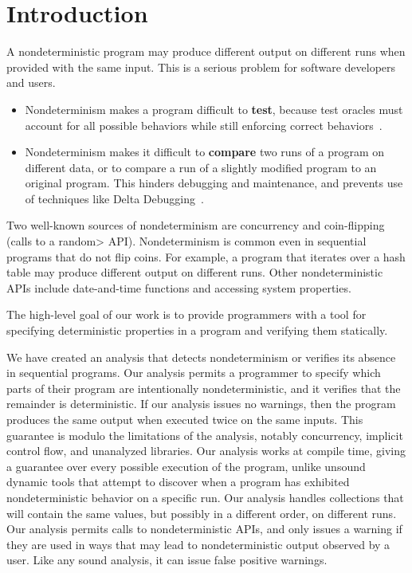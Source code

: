 \section{Introduction\label{sec:introduction}}

A nondeterministic program may produce different output on different runs
when provided with the same input. This is a serious problem for software developers and users.
\begin{itemize}
\item
  Nondeterminism makes a program difficult to \textbf{test}, because test
  oracles must account for all possible behaviors while still enforcing
  correct behaviors~\cite{LuoHEM2014,ShiGLM2016,BellLHEYM2018,Sudarshan}.
\item
  Nondeterminism makes it difficult to \textbf{compare} two runs of a
  program on different data, or to compare a run of a slightly modified
  program to an original program.  This hinders debugging and maintenance,
  and prevents use of techniques like Delta Debugging~\cite{Zeller1999,YuLCZ2012}.
\end{itemize}

Two well-known sources of nondeterminism are concurrency
and coin-flipping
(calls to a \<random> API\@).
Nondeterminism is common even in sequential
programs that do not flip coins.
For example, a program that iterates over a hash table
may produce different output on different runs.
Other nondeterministic APIs include date-and-time functions and
accessing system properties.

The high-level goal of our work is to provide programmers with a tool for
specifying deterministic properties in a program and verifying them
statically.

We have created an analysis that detects nondeterminism or verifies its
absence in sequential programs.
Our analysis permits a programmer to specify which parts of their program
are intentionally nondeterministic, and it verifies that the remainder is deterministic.
If our analysis issues no warnings, then the program produces the same
output when executed twice on the same inputs.  This guarantee is modulo
the limitations of the
analysis, notably concurrency, implicit control flow, and unanalyzed libraries.
Our analysis works at compile time, giving a guarantee over every possible
execution of the program, unlike unsound dynamic tools that attempt
to discover when a program has exhibited nondeterministic behavior on a
specific run.  
Our analysis handles collections that will contain the same values, but
possibly in a different order, on different runs.
Our analysis permits calls to
nondeterministic APIs, and only issues a warning if they are used in ways
that may lead to nondeterministic output observed by a user.  Like any
sound analysis, it can issue false positive warnings.

